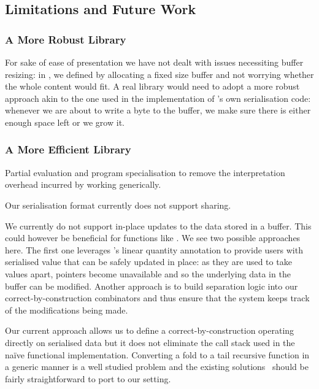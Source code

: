 
\subsection{Limitations and Future Work}

\subsubsection{A More Robust Library}

For sake of ease of presentation we have not dealt with issues necessiting
buffer resizing: in ,
we defined 
by allocating a fixed size buffer and not worrying whether the whole content
would fit.
%
A real library would need to adopt a more robust approach
akin to the one used in the implementation of \idris{}'s own serialisation
code: whenever we are about to write a byte to the buffer, we make sure there
is either enough space left or we grow it.

\subsubsection{A More Efficient Library}

Partial evaluation and program specialisation to remove the interpretation
overhead incurred by working generically.

Our serialisation format currently does not support sharing.


We currently do not support in-place updates to the data stored in a buffer.
This could however be beneficial for functions like .
%
We see two possible approaches here. The first one leverages \idris{}'s
linear quantity annotation to provide users with serialised value that
can be safely updated in place: as they are used to take values apart,
pointers become unavailable and so the underlying data in the buffer can
be modified.
%
Another approach is to build separation logic into our correct-by-construction
combinators and thus ensure that the system keeps track of the modifications
being made.



Our current approach allows us to define a correct-by-construction
 operating directly on serialised data but it
does not eliminate the call stack used in the naïve functional
implementation.
%
Converting a fold to a tail recursive function in a generic manner
is a well studied problem and the existing
solutions~\cite{DBLP:conf/popl/McBride08,DBLP:conf/icfp/CortinasS18}
should be fairly straightforward to port to our setting.

